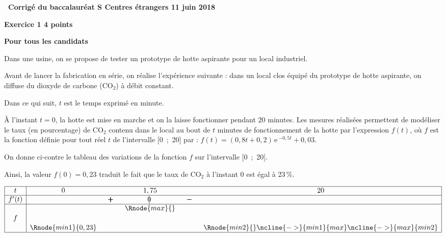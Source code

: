\documentclass[10pt]{article}
\newcommand{\e}{\mathrm{\,e\,}}%
\begin{document}
\setlength\parindent{0mm}
\pagestyle{fancy}
\thispagestyle{empty} 

\begin{center} {\Large{\textbf{\decofourleft~Corrigé du baccalauréat S  Centres étrangers 11 juin 2018~\decofourright}}}
\end{center}

\vspace{0.5cm}

\textbf{\large{Exercice 1} \hfill 4 points}
 
\textbf{Pour tous les candidats}

\medskip

Dans une usine, on se propose de tester un prototype de hotte aspirante pour un local industriel.

Avant de lancer la fabrication en série, on réalise l'expérience suivante : dans un local clos équipé
du prototype de hotte aspirante, on diffuse du dioxyde de carbone (CO$_2$) à débit constant.

Dans ce qui suit, $t$ est le temps exprimé en minute.

À l'instant $t = 0$, la hotte est mise en marche et on la laisse fonctionner pendant $20$ minutes. Les
mesures réalisées permettent de modéliser le taux (en pourcentage) de CO$_2$ contenu dans le local au
bout de $t$ minutes de fonctionnement de la hotte par l'expression $f(t)$, où $f$ est la fonction définie
pour tout réel $t$ de l'intervalle [0~;~20] par :
$f(t) = (0,8t + 0,2)\e^{-0,5t} + 0,03$.

\medskip

\parbox{0.57\linewidth}{On donne ci-contre le tableau des variations de la fonction $f$ sur l'intervalle [0~;~20].

Ainsi, la valeur $f(0) = 0,23$ traduit le fait que le taux 
de CO$_2$ à l'instant $0$ est égal à 23\,\%.}\hfill
\parbox{0.41\linewidth}{
\begin{flushright}
{\renewcommand{\arraystretch}{1.3}
\def\esp{\hspace*{0.7cm}}%
\def\hauteur{10pt}%
$\begin{array}{|c|*5{c}|}
\hline
t & 0  & \esp & 1,75 & \esp & 20 \\ 
\hline
f'(t) &  &   \pmb{+} & \vline\hspace{-2.7pt}0 & \pmb{-} & \\ 
\hline
 & &  &   \Rnode{max}{}  &  &   \\  
f & &     &  &  &  \rule{0pt}{\hauteur} \\ 
 & \Rnode{min1}{0,23} &   &  &  &   \Rnode{min2}{} \rule{0pt}{\hauteur}    
 \ncline{->}{min1}{max} 
 \ncline{->}{max}{min2} 
 \\ 
\hline
\end{array} $
}
\end{flushright}}
\end{document}

